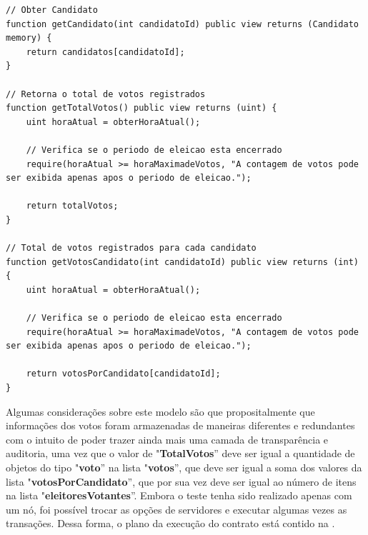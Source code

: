 \documentclass[portuguese]{textolivre}
\begin{document}
\begin{lstlisting}[language=Solidity, label=Codigo-consultas, caption={Funções de consulta do Contrato Inteligente.}, source={Autor.}]
// Obter Candidato
function getCandidato(int candidatoId) public view returns (Candidato memory) {
	return candidatos[candidatoId];
}

// Retorna o total de votos registrados
function getTotalVotos() public view returns (uint) {
	uint horaAtual = obterHoraAtual();
	
	// Verifica se o periodo de eleicao esta encerrado
	require(horaAtual >= horaMaximadeVotos, "A contagem de votos pode ser exibida apenas apos o periodo de eleicao.");
	
	return totalVotos;
}

// Total de votos registrados para cada candidato
function getVotosCandidato(int candidatoId) public view returns (int) {
	uint horaAtual = obterHoraAtual();
	
	// Verifica se o periodo de eleicao esta encerrado
	require(horaAtual >= horaMaximadeVotos, "A contagem de votos pode ser exibida apenas apos o periodo de eleicao.");
	
	return votosPorCandidato[candidatoId];
}
\end{lstlisting} %
	
	Algumas considerações sobre este modelo são que propositalmente que informações dos votos foram armazenadas de maneiras diferentes e redundantes com o intuito de poder trazer ainda mais uma camada de transparência e auditoria, uma vez que o valor de "\textbf{TotalVotos}'' deve ser igual a quantidade de objetos do tipo "\textbf{voto}''  na lista "\textbf{votos}'', que deve ser igual a soma dos valores da lista "\textbf{votosPorCandidato}'', que por sua vez deve ser igual ao número de itens na lista "\textbf{eleitoresVotantes}''. Embora o teste tenha sido realizado apenas com um nó, foi possível trocar as opções de servidores e executar algumas vezes as transações. Dessa forma, o plano da execução do contrato está contido na .
	
	
	
	
\end{document}
